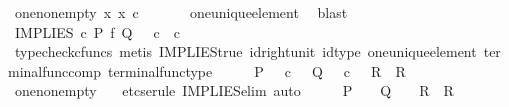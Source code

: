 \begin{isabellebody}
\ one{\isacharunderscore}{\kern0pt}nonempty{\isacharcolon}{\kern0pt}\ {\isachardoublequoteopen}{\isasymexists}x{\isachardot}{\kern0pt}\ x\ {\isasymin}\isactrlsub c\ {\isasymone}{\isachardoublequoteclose}\isanewline
\ \ \ \ \isamarkupfalse%
\ one{\isacharunderscore}{\kern0pt}unique{\isacharunderscore}{\kern0pt}element\ \isamarkupfalse%
\ blast\isanewline
\ \ \isamarkupfalse%
\ {\isachardoublequoteopen}{\isacharparenleft}{\kern0pt}IMPLIES\ {\isasymcirc}\isactrlsub c\ {\isacharparenleft}{\kern0pt}P\ {\isasymtimes}\isactrlsub f\ Q{\isacharparenright}{\kern0pt}\ {\isacharequal}{\kern0pt}\ {\isasymt}\ {\isasymcirc}\isactrlsub c\ {\isasymbeta}\isactrlbsub {\isasymone}\ {\isasymtimes}\isactrlsub c\ {\isasymone}\isactrlesub {\isacharparenright}{\kern0pt}{\isachardoublequoteclose}\isanewline
\ \ \ \ \isamarkupfalse%
\ {\isacharparenleft}{\kern0pt}typecheck{\isacharunderscore}{\kern0pt}cfuncs{\isacharcomma}{\kern0pt}\ metis\ IMPLIES{\isacharunderscore}{\kern0pt}true\ id{\isacharunderscore}{\kern0pt}right{\isacharunderscore}{\kern0pt}unit{}\ id{\isacharunderscore}{\kern0pt}type\ one{\isacharunderscore}{\kern0pt}unique{\isacharunderscore}{\kern0pt}element\ terminal{\isacharunderscore}{\kern0pt}func{\isacharunderscore}{\kern0pt}comp\ terminal{\isacharunderscore}{\kern0pt}func{\isacharunderscore}{\kern0pt}type{\isacharparenright}{\kern0pt}\isanewline
\ \ \isamarkupfalse%
\ \isamarkupfalse%
\ {\isachardoublequoteopen}{\isacharparenleft}{\kern0pt}P\ {\isacharequal}{\kern0pt}\ {\isasymt}\ {\isasymcirc}\isactrlsub c\ {\isasymbeta}\isactrlbsub {\isasymone}\isactrlesub {\isacharparenright}{\kern0pt}\ {\isasymLongrightarrow}\ {\isacharparenleft}{\kern0pt}{\isacharparenleft}{\kern0pt}Q\ {\isacharequal}{\kern0pt}\ {\isasymt}\ {\isasymcirc}\isactrlsub c\ {\isasymbeta}\isactrlbsub {\isasymone}\isactrlesub {\isacharparenright}{\kern0pt}\ {\isasymLongrightarrow}\ R{\isacharparenright}{\kern0pt}\ {\isasymLongrightarrow}\ R{\isachardoublequoteclose}\isanewline
\ \ \ \ \isamarkupfalse%
\ one{\isacharunderscore}{\kern0pt}nonempty\ \isamarkupfalse%
\ {\isacharparenleft}{\kern0pt}{\isacharminus}{\kern0pt}{\isacharcomma}{\kern0pt}\ etcs{\isacharunderscore}{\kern0pt}erule\ IMPLIES{\isacharunderscore}{\kern0pt}elim{\isacharcomma}{\kern0pt}\ auto{\isacharparenright}{\kern0pt}\isanewline
\ \ \isamarkupfalse%
\ \isamarkupfalse%
\ {\isachardoublequoteopen}{\isacharparenleft}{\kern0pt}P\ {\isacharequal}{\kern0pt}\ {\isasymt}{\isacharparenright}{\kern0pt}\ {\isasymLongrightarrow}\ {\isacharparenleft}{\kern0pt}{\isacharparenleft}{\kern0pt}Q\ {\isacharequal}{\kern0pt}\ {\isasymt}{\isacharparenright}{\kern0pt}\ {\isasymLongrightarrow}\ R{\isacharparenright}{\kern0pt}\ {\isasymLongrightarrow}\ R{\isachardoublequoteclose}\isanewline

\end{isabellebody}

